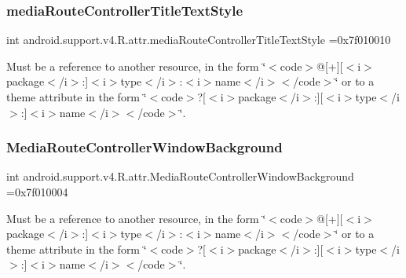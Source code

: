 \subsubsection{\texorpdfstring{media\+Route\+Controller\+Title\+Text\+Style}{mediaRouteControllerTitleTextStyle}}
{\footnotesize\ttfamily int android.\+support.\+v4.\+R.\+attr.\+media\+Route\+Controller\+Title\+Text\+Style =0x7f010010\hspace{0.3cm}{\ttfamily [static]}}

Must be a reference to another resource, in the form \char`\"{}$<$code$>$@\mbox{[}+\mbox{]}\mbox{[}$<$i$>$package$<$/i$>$\+:\mbox{]}$<$i$>$type$<$/i$>$\+:$<$i$>$name$<$/i$>$$<$/code$>$\char`\"{} or to a theme attribute in the form \char`\"{}$<$code$>$?\mbox{[}$<$i$>$package$<$/i$>$\+:\mbox{]}\mbox{[}$<$i$>$type$<$/i$>$\+:\mbox{]}$<$i$>$name$<$/i$>$$<$/code$>$\char`\"{}. \mbox{\label{classandroid_1_1support_1_1v4_1_1R_1_1attr_a0c86276ac1a506b1153d2eaeb2023ac0}} 
\subsubsection{\texorpdfstring{Media\+Route\+Controller\+Window\+Background}{MediaRouteControllerWindowBackground}}
{\footnotesize\ttfamily int android.\+support.\+v4.\+R.\+attr.\+Media\+Route\+Controller\+Window\+Background =0x7f010004\hspace{0.3cm}{\ttfamily [static]}}

Must be a reference to another resource, in the form \char`\"{}$<$code$>$@\mbox{[}+\mbox{]}\mbox{[}$<$i$>$package$<$/i$>$\+:\mbox{]}$<$i$>$type$<$/i$>$\+:$<$i$>$name$<$/i$>$$<$/code$>$\char`\"{} or to a theme attribute in the form \char`\"{}$<$code$>$?\mbox{[}$<$i$>$package$<$/i$>$\+:\mbox{]}\mbox{[}$<$i$>$type$<$/i$>$\+:\mbox{]}$<$i$>$name$<$/i$>$$<$/code$>$\char`\"{}. \mbox{\label{classandroid_1_1support_1_1v4_1_1R_1_1attr_aecd38582480f3fa0715b0946cd73694e}} 
